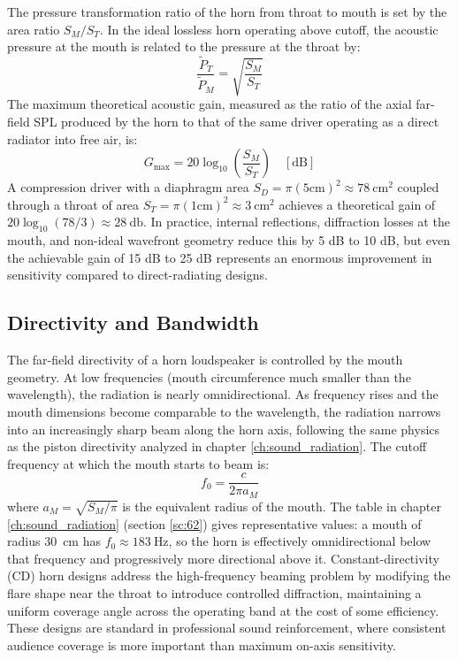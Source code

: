 The pressure transformation ratio of the horn from throat to mouth is set by the area ratio \(S_M/S_T\).
In the ideal lossless horn operating above cutoff, the acoustic pressure at the mouth is related to the pressure at the throat by:
\[
\frac{\tilde{P}_T}{\tilde{P}_M} = \sqrt{\frac{S_M}{S_T}}
\]
The maximum theoretical acoustic gain, measured as the ratio of the axial far-field SPL produced by the horn to that of the same driver operating as a direct radiator into free air, is:
\begin{equation}
    G_\mathrm{max} = 20\log_{10}\left(\frac{S_M}{S_T}\right) \quad [\mathrm{dB}]
    \label{eq:hornGain}
\end{equation}
A compression driver with a diaphragm area \(S_D = \pi (5 \mathrm{cm})^2 \approx \SI{78}{\centi\meter\squared}\) coupled through a throat of area \(S_T = \pi (1 \mathrm{cm})^2 \approx \SI{3}{\centi\meter\squared}\) achieves a theoretical gain of \(20\log_{10}(78/3) \approx \SI{28}{\decibel}\).
In practice, internal reflections, diffraction losses at the mouth, and non-ideal wavefront geometry reduce this by 5 dB to 10 dB, but even the achievable gain of 15 dB to 25 dB represents an enormous improvement in sensitivity compared to direct-radiating designs.

\subsection{Directivity and Bandwidth}
\label{ssc:1035}

The far-field directivity of a horn loudspeaker is controlled by the mouth geometry.
At low frequencies (mouth circumference much smaller than the wavelength), the radiation is nearly omnidirectional.
As frequency rises and the mouth dimensions become comparable to the wavelength, the radiation narrows into an increasingly sharp beam along the horn axis, following the same physics as the piston directivity analyzed in chapter \ref{ch:sound_radiation}.
The cutoff frequency at which the mouth starts to beam is:
\[
f_0 = \frac{c}{2\pi a_M}
\]
where \(a_M = \sqrt{S_M/\pi}\) is the equivalent radius of the mouth.
The table in chapter \ref{ch:sound_radiation} (section \ref{sc:62}) gives representative values: a mouth of radius \SI{30}{\centi\meter} has \(f_0 \approx \SI{183}{\hertz}\), so the horn is effectively omnidirectional below that frequency and progressively more directional above it.
Constant-directivity (CD) horn designs address the high-frequency beaming problem by modifying the flare shape near the throat to introduce controlled diffraction, maintaining a uniform coverage angle across the operating band at the cost of some efficiency.
These designs are standard in professional sound reinforcement, where consistent audience coverage is more important than maximum on-axis sensitivity.

